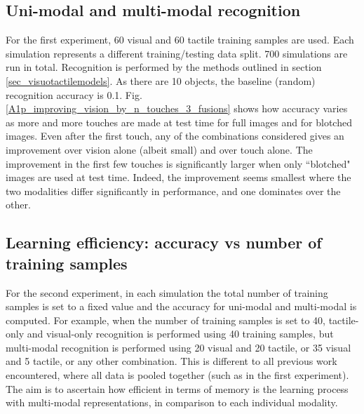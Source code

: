 \documentclass[letterpaper, 10 pt, conference]{ieeeconf}  %
\begin{document}
\subsection{Uni-modal and multi-modal recognition}
For the first experiment, 60 visual and 60 tactile training samples are used. Each simulation represents a different training/testing data split. 700 simulations are run in total. Recognition is performed by the methods outlined in section \ref{sec_visuotactilemodels}. As there are 10 objects, the baseline (random) recognition accuracy is 0.1.
Fig. \ref{A1p_improving_vision_by_n_touches_3_fusions} shows how accuracy varies as more and more touches are made at test time for full images and for blotched images. Even after the first touch, any of the combinations considered gives an improvement over vision alone (albeit small) and over touch alone. The improvement in the first few touches is significantly larger when only ``blotched" images are used at test time. Indeed, the improvement seems smallest where the two modalities differ significantly in performance, and one dominates over the other. 
\begin{figure}
	\centering
\end{figure}

\subsection{Learning efficiency: accuracy vs number of training samples}
For the second experiment, in each simulation the total number of training samples is set to a fixed value and the accuracy for uni-modal and multi-modal is computed. For example, when the number of training samples is set to 40, tactile-only and visual-only recognition is performed using 40 training samples, but multi-modal recognition is performed using 20 visual and 20 tactile, or 35 visual and 5 tactile, or any other combination. This is different to all previous work encountered, where all data is pooled together (such as in the first experiment). The aim is to ascertain how efficient in terms of memory is the learning process with multi-modal representations, in comparison to each individual modality. 
\end{document}
